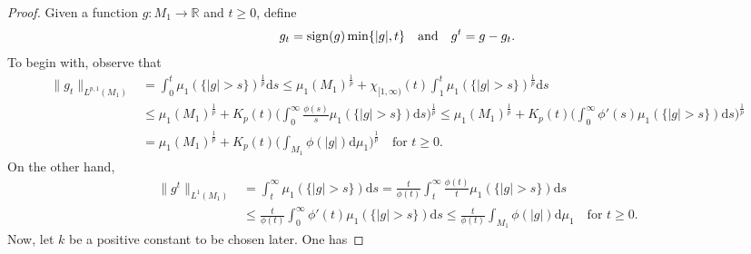 \documentclass[leqno,11pt]{amsart}%
\numberwithin{equation}{section}
\def\R{\mathbb R}
\def\d{\mathrm{d}}
\theoremstyle{definition}
\numberwithin{equation}{section}
\begin{document}
\begin{proof}
Given a function $g:M_1\to\R$ and $t\geq 0$, define 
$$g_t= {\rm sign} (g) \min\{|g|,t\} \quad \text{and} \quad g^t= g- g_t.$$
To begin with, observe that
\begin{align}
    \label{SP4}
    \|g_t\|_{L^{p,1}(M_1)} &= \int_0^t\mu_1(\{|g|>s\})^{\frac 1p}\d s \leq \mu_1(M_1)^{\frac 1p}+ \chi_{[1,\infty)}(t)\int_1^t\mu_1(\{|g|>s\})^{\frac 1p}\d s
    \\ \nonumber &\leq 
    \mu_1(M_1)^{\frac 1p} + K_p(t) \bigg(\int_0^\infty \frac{\phi(s)}s \mu_1(\{|g|>s\})\d s\bigg)^{\frac{1}{p}}
   \leq 
    \mu_1(M_1)^{\frac 1p} + K_p(t) \bigg(\int_0^\infty \phi'(s)\mu_1(\{|g|>s\})\d s\bigg)^{\frac{1}{p}}
    \\ \nonumber & =  \mu_1(M_1)^{\frac 1p} + K_p(t) \bigg(\int_{M_1}\phi(|g|)\d \mu_1\bigg)^{\frac 1p}   \quad \text{for $t \geq 0$.}
\end{align}
On the other hand,
\begin{align}\label{SP5}
\|g^t\|_{L^1(M_1)} & = \int_t^\infty \mu_1(\{|g|>s\})\d s= \frac{t}{\phi(t)} \int_t^\infty \frac{\phi(t)}{t}\mu_1(\{|g|>s\})\d s
\\ & \leq \nonumber  
\frac{t}{\phi(t)} \int _0^\infty \phi'(t)\mu_1(\{|g|>s\})\d s
   \leq  \frac{t}{\phi(t)} \int_{M_1}\phi(|g|)\d \mu_1 \quad \text{for $t \geq 0$.}
\end{align}
   Now,  let $k$ be a positive constant to be chosen later. One has


\end{proof}
\end{document}
